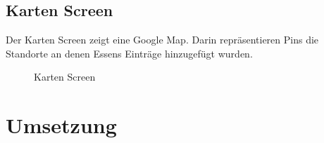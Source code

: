 \documentclass[
    DIV12,
    cleardouble=plain,
    headings=normal,
    pdftex,
    headexclude,footexclude,
    final
]{scrreprt}
\begin{document}
\section{Karten Screen}
Der Karten Screen zeigt eine Google Map. Darin repräsentieren Pins die Standorte an denen Essens Einträge hinzugefügt wurden.
\begin{figure}[H]
	\centering
	\caption{Karten Screen}
	\label{map}
\end{figure}



\newpage

\chapter{Umsetzung}
\end{document}

